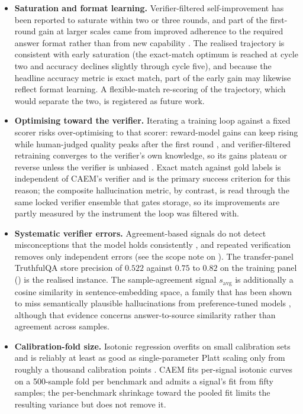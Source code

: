 \begin{itemize}
\item \textbf{Saturation and format learning.} Verifier-filtered self-improvement has been reported to saturate within two or three rounds, and part of the first-round gain at larger scales came from improved adherence to the required answer format rather than from new capability \cite{song2024gap}. The realised trajectory is consistent with early saturation (the exact-match optimum is reached at cycle two and accuracy declines slightly through cycle five), and because the headline accuracy metric is exact match, part of the early gain may likewise reflect format learning. A flexible-match re-scoring of the trajectory, which would separate the two, is registered as future work.
\item \textbf{Optimising toward the verifier.} Iterating a training loop against a fixed scorer risks over-optimising to that scorer: reward-model gains can keep rising while human-judged quality peaks after the first round \cite{gulcehre2023rest}, and verifier-filtered retraining converges to the verifier's own knowledge, so its gains plateau or reverse unless the verifier is unbiased \cite{fu2025collapse}. Exact match against gold labels is independent of CAEM's verifier and is the primary success criterion for this reason; the composite hallucination metric, by contrast, is read through the same locked verifier ensemble that gates storage, so its improvements are partly measured by the instrument the loop was filtered with.
\item \textbf{Systematic verifier errors.} Agreement-based signals do not detect misconceptions that the model holds consistently \cite{farquhar2024semantic}, and repeated verification removes only independent errors (see the scope note on ). The transfer-panel TruthfulQA store precision of $0.522$ against $0.75$ to $0.82$ on the training panel () is the realised instance. The sample-agreement signal $s_{\text{avg}}$ is additionally a cosine similarity in sentence-embedding space, a family that has been shown to miss semantically plausible hallucinations from preference-tuned models \cite{sinha2025semantic}, although that evidence concerns answer-to-source similarity rather than agreement across samples.
\item \textbf{Calibration-fold size.} Isotonic regression overfits on small calibration sets and is reliably at least as good as single-parameter Platt scaling only from roughly a thousand calibration points \cite{niculescu2005predicting}. CAEM fits per-signal isotonic curves on a 500-sample fold per benchmark and admits a signal's fit from fifty samples; the per-benchmark shrinkage toward the pooled fit limits the resulting variance but does not remove it.

\end{itemize}
